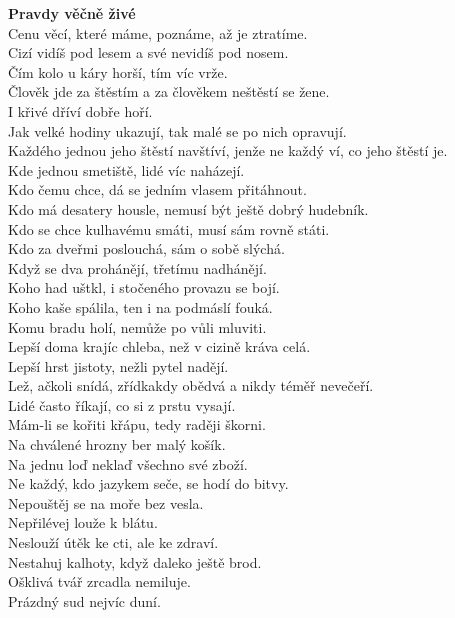 \begin{multicols}{\value{columnsgames}}
\noindent
{\large\bf Pravdy věčně živé}\\[1 mm]
Cenu věcí, které máme, poznáme, až je ztratíme.\\
Cizí vidíš pod lesem a své nevidíš pod nosem.\\
Čím kolo u káry horší, tím víc vrže.\\
Člověk jde za štěstím a za člověkem neštěstí se žene.\\
I křivé dříví dobře hoří.\\
Jak velké hodiny ukazují, tak malé se po nich opravují.\\
Každého jednou jeho štěstí navštíví, jenže ne každý ví, co jeho 
štěstí je.\\
Kde jednou smetiště, lidé víc naházejí.\\
Kdo čemu chce, dá se jedním vlasem přitáhnout.\\
Kdo má desatery housle, nemusí být ještě dobrý hudebník.\\
Kdo se chce kulhavému smáti, musí sám rovně státi.\\
Kdo za dveřmi poslouchá, sám o sobě slýchá.\\
Když se dva prohánějí, třetímu nadhánějí.\\
Koho had uštkl, i stočeného provazu se bojí.\\
Koho kaše spálila, ten i na podmáslí fouká.\\
Komu bradu holí, nemůže po vůli mluviti.\\
Lepší doma krajíc chleba, než v cizině kráva celá.\\
Lepší hrst jistoty, nežli pytel nadějí.\\
Lež, ačkoli snídá, zřídkakdy obědvá a nikdy téměř nevečeří.\\
Lidé často říkají, co si z prstu vysají.\\
Mám-li se kořiti křápu, tedy raději škorni.\\
Na chválené hrozny ber malý košík.\\
Na jednu loď neklaď všechno své zboží.\\
Ne každý, kdo jazykem seče, se hodí do bitvy.\\
Nepouštěj se na moře bez vesla.\\
Nepřilévej louže k blátu.\\
Neslouží útěk ke cti, ale ke zdraví.\\
Nestahuj kalhoty, když daleko ještě brod.\\
Ošklivá tvář zrcadla nemiluje.\\
Prázdný sud nejvíc duní.\\

\end{multicols}
